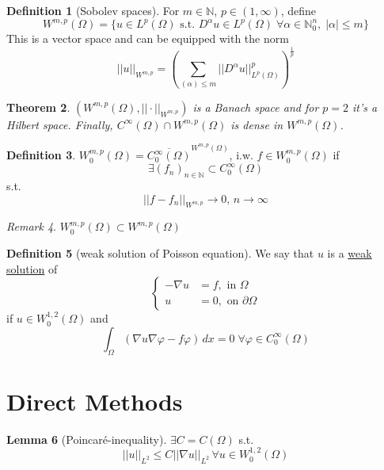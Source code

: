\documentclass[a4paper, 12pt]{article}
\theoremstyle{plain}
\newtheorem{theorem}{Theorem}[section] %
\theoremstyle{definition}
\newtheorem{definition}[theorem]{Definition} %
\theoremstyle{lemma}
\newtheorem{lemma}[theorem]{Lemma}
\theoremstyle{remark}
\newtheorem{remark}[theorem]{Remark}
\theoremstyle{corollary}
\theoremstyle{example}
\begin{document}
	\begin{definition}[Sobolev spaces]
		For $m \in \mathbb{N}$, $p \in (1,\infty)$, define \[W^{m,p}(\Omega) = \{u \in L^p(\Omega) \text{ s.t. } D^\alpha u \in L^p(\Omega) \; \forall \alpha \in \mathbb{N}_0^n, \; \left|\alpha\right| \leq m\}\] This is a vector space and can be equipped with the norm \[||u||_{W^{m,p}} = \left(\sum_{\left(\alpha\right) \leq m} ||D^\alpha u||^p_{L^p(\Omega)}\right)^{\frac{1}{p}}\]
	\end{definition}
	\begin{theorem}
		$(W^{m,p}(\Omega), ||\cdot||_{W^{m,p}})$ is a Banach space and for $p=2$ it's a Hilbert space. Finally, $C^\infty(\Omega) \cap W^{m,p}(\Omega)$ is dense in $W^{m,p}(\Omega)$.
	\end{theorem}
	\begin{definition}
		$W_0^{m,p}(\Omega) = \overline{C_0^\infty(\Omega)}^{W^{m,p}(\Omega)}$, i.w. $f \in W_0^{m,p}(\Omega)$ if \[\exists (f_n)_{n \in \mathbb{N}} \subset C_0^\infty (\Omega)\] s.t. \[||f-f_n||_{W^{m,p}} \to 0, \, n \to \infty\]
	\end{definition}
	\begin{remark}
		$W_0^{m,p}(\Omega) \subset W^{m,p}(\Omega)$
	\end{remark}
	\begin{definition}[weak solution of Poisson equation]
		We say that $u$ is a \underline{weak solution} of \[\begin{cases}
			-\nabla u &= f, \text{ in } \Omega\\
			u &= 0, \text{ on } \partial \Omega
		\end{cases}\] if $u \in W_0^{1,2}(\Omega)$ and \[\int_\Omega (\nabla u \nabla \varphi - f\varphi) \, dx = 0 \; \forall \varphi \in C_0^\infty(\Omega)\]
	\end{definition}
	\section{Direct Methods}
	\begin{lemma}[Poincaré-inequality]
		$\exists C = C(\Omega)$ s.t. \[||u||_{L^2} \leq C||\nabla u||_{L^2} \, \forall u \in W_0^{1,2}(\Omega)\]
	\end{lemma}
\end{document}
